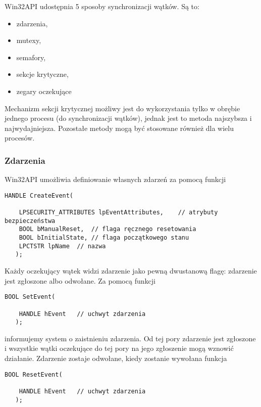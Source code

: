 Win32API udostępnia 5 sposoby synchronizacji wątków. Są to: 
\begin{itemize}
  \item zdarzenia, 
  \item mutexy, 
  \item semafory, 
  \item sekcje krytyczne, 
  \item zegary oczekujące
\end{itemize}

Mechanizm sekcji krytycznej możliwy jest do wykorzystania tylko w obrębie 
jednego procesu (do synchronizacji wątków), jednak jest to metoda 
najszybsza i najwydajniejsza. Pozostałe metody mogą być stosowane również dla wielu procesów. 

\subsubsection{Zdarzenia}

Win32API umożliwia definiowanie własnych zdarzeń za pomocą funkcji 

\begin{scriptsize}
\begin{verbatim}
HANDLE CreateEvent(

    LPSECURITY_ATTRIBUTES lpEventAttributes,	// atrybuty bezpieczeństwa
    BOOL bManualReset,	// flaga ręcznego resetowania
    BOOL bInitialState,	// flaga początkowego stanu
    LPCTSTR lpName 	// nazwa
   );
\end{verbatim}
\end{scriptsize}

Każdy oczekujący wątek widzi zdarzenie jako pewną dwustanową flagę: zdarzenie jest zgłoszone 
albo odwołane. Za pomocą funkcji 

\begin{scriptsize}
\begin{verbatim}
BOOL SetEvent(

    HANDLE hEvent 	// uchwyt zdarzenia
   );
\end{verbatim}
\end{scriptsize}

informujemy system o zaistnieniu zdarzenia. 
Od tej pory zdarzenie jest zgłoszone i wszystkie wątki oczekujące do tej pory na jego 
zgłoszenie mogą wznowić działanie. Zdarzenie zostaje odwołane, kiedy zostanie wywołana 
funkcja 

\begin{scriptsize}
\begin{verbatim}
BOOL ResetEvent(

    HANDLE hEvent 	// uchwyt zdarzenia
   );
\end{verbatim}
\end{scriptsize}

